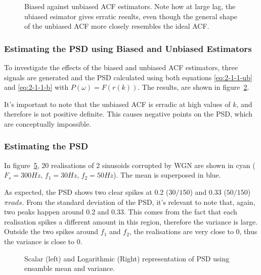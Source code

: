 \documentclass[main.tex]{subfiles}
\begin{document}
\begin{figure}[H]
	\centering 
	\resizebox{\textwidth}{!}{}
	\caption{Biased against unbiased ACF estimators. Note how at large lag, the ubiased esimator gives erratic results, even though the general shape of the unbiased ACF more closely resembles the ideal ACF. }
	\label{fig:2-1-a-vs}
\end{figure}

\subsubsection{Estimating the PSD using Biased and Unbiased Estimators}

To investigate the effects of the biased and unbiased ACF estimators, three signals are generated and the PSD calculated using both equations \ref{eq:2-1-1-ub} and \ref{eq:2-1-1-b} with $P(\omega) = F(r(k))$. The results, are shown in figure~\ref{fig:q2_1_a}.

\begin{figure}[H]
	\centering 
	\resizebox{\textwidth}{!}{}
	\caption{}
	\label{fig:q2_1_a}
\end{figure}

It's important to note that the unbiased ACF is erradic at high values of $k$, and therefore is not positive definite. This causes negative points on the PSD, which are conceptually impossible. 





\subsubsection{Estimating the PSD}

In figure~\ref{fig:2-1-b}, 20 realisations of 2 sinusoids corrupted by WGN are shown in cyan ($F_s = 300Hz$, $f_1= 30Hz$, $f_2=50Hz$). The mean is superposed in blue. 

As expected, the PSD shows two clear spikes at 0.2 ($30/150$) and 0.33 ($50/150$)$\pi rads$. From the standard deviation of the PSD, it's relevant to note that, again, two peaks happen around 0.2 and 0.33. This comes from the fact that each realisation spikes a different amount in this region, therefore the variance is large. Outside the two spikes around $f_1$ and $f_2$, the realisations are very close to 0, thus the variance is close to 0.

\begin{figure}[H]
	\centering
	\begin{subfigure}[b]{0.9\textwidth}
		\resizebox{\textwidth}{!}{}
		\label{fig:2-1-b-a}
	\end{subfigure}%
	
	\begin{subfigure}[b]{0.9\textwidth}
		\resizebox{\textwidth}{!}{}
		\label{fig:2-1-b-b}
	\end{subfigure}
	\label{fig:2-1-b}
	\caption{Scalar (left) and Logarithmic (Right) representation of PSD using ensamble mean and variance.}
\end{figure}
\end{document}
